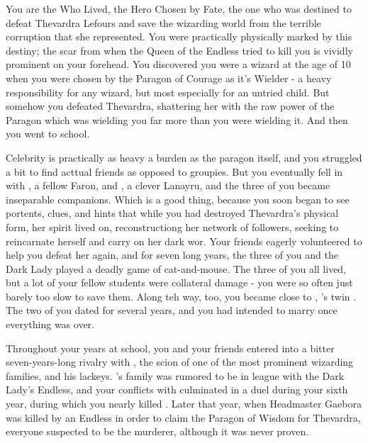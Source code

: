 \documentclass[char]{Katmeers}
\begin{document}
\name{\cHarry{}}


You are the \cHarry{\Kid} Who Lived, the Hero Chosen by Fate, the one who was destined to defeat Thevardra Lefours and save the wizarding world from the terrible corruption that she represented. You were practically physically marked by this destiny; the scar from when the Queen of the Endless tried to kill you is vividly prominent on your forehead. You discovered you were a wizard at the age of 10 when you were chosen by the Paragon of Courage as it's Wielder - a heavy responsibility for any wizard, but most especially for an untried child. But somehow you defeated Thevardra, shattering her with the raw power of the Paragon which was wielding you far more than you were wielding it. And then you went to school.

Celebrity is practically as heavy a burden as the paragon itself, and you struggled a bit to find acttual friends as opposed to groupies. But you eventually fell in with \cRon{}, a fellow Faron, and \cHermione{}, a clever Lanayru, and the three of you became inseparable companions. Which is a good thing, because you soon began to see portents, clues, and hints that while you had destroyed Thevardra's physical form, her spirit lived on, reconstructiong her network of followers, seeking to reincarnate herself  and carry on her dark wor. Your friends eagerly volunteered to help you defeat her again, and for seven long years, the three of you and the Dark Lady played a deadly game of cat-and-mouse. The three of you all lived, but a lot of your fellow students were collateral damage - you were so often just barely too slow to save them. Along teh way, too, you became close to \cGinny{}, \cRon{}'s twin \cGinny{\sibling}. The two of you dated for several years, and you had intended to marry \cGinny{\them} once everything was over.

Throughout your years at school, you and your friends entered into a bitter seven-years-long rivalry with \cMalfoy{}, the scion of one of the most prominent wizarding families, and his lackeys. \cMalfoy{}'s family was rumored to be in league with the Dark Lady's Endless, and your conflicts with \cMalfoy{} culminated in a duel during your sixth year, during which you nearly killed \cMalfoy{\them}. Later that year, when Headmaster Gaebora was killed by an Endless in order to claim the Paragon of Wisdom for Thevardra, everyone suspected \cMalfoy{} to be the murderer, although it was never proven.
\end{document}
